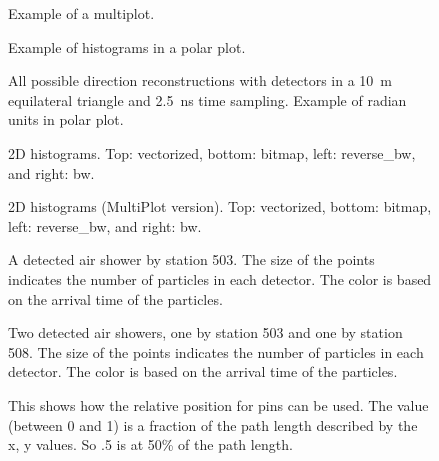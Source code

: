 \documentclass[a4paper,11pt]{article}
\begin{document}
\begin{figure}
\centering

\caption{Example of a multiplot.}
\end{figure}

\begin{figure}
\centering

\caption{Example of histograms in a polar plot.}
\end{figure}

\begin{figure}
\centering

\caption{All possible direction reconstructions with detectors in a
\SI{10}{\meter} equilateral triangle and \SI{2.5}{\nano\second} time
sampling. Example of radian units in polar plot.}
\end{figure}

\begin{figure}
\centering

\caption{2D histograms. Top: vectorized, bottom: bitmap, left:
reverse\_bw, and right: bw.}
\end{figure}

\begin{figure}
\centering

\caption{2D histograms (MultiPlot version). Top: vectorized, bottom:
bitmap, left: reverse\_bw, and right: bw.}
\end{figure}

\begin{figure}
\centering

\caption{A detected air shower by station 503. The size of the points
indicates the number of particles in each detector. The color is based
on the arrival time of the particles.}
\end{figure}

\begin{figure}
\centering

\caption{Two detected air showers, one by station 503 and one by station
508. The size of the points indicates the number of particles in each
detector. The color is based on the arrival time of the particles.}
\end{figure}

\begin{figure}
\centering

\caption{This shows how the relative position for pins can be used.
         The value (between 0 and 1) is a fraction of the path length
         described by the x, y values. So .5 is at 50\% of the path length.}
\end{figure}
\end{document}
